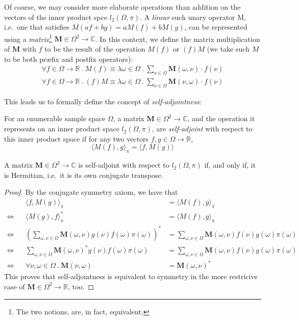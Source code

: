 	Of course, we may consider more elaborate operations than addition on the vectors of the
	inner product spce $l_2(\Omega, \pi)$. A \emph{linear} such unary operator M, i.e.\ one 
	that satisfies $M (a f + b g) = a M(f) + b M(g)$, can be represented using a 
	\emph{matrix}\footnote{The two notions, are, in fact, equivalent.}
	$\mathbf{M} \in \Omega^2 \rightarrow \mathbb{C}$. In this context, we define the matrix 
	multiplication of $\mathbf{M}$ with $f$ to be the result of the operation $M(f)$ or $(f)M$ 
	(we take such $M$ to be both pr{\ae}fix and postfix operators):
	\begin{align*}
		\forall f \in\Omega\rightarrow\mathbb{R}\ .\  M(f)\equiv\lambda \omega\in\Omega\ .\ 
		\sum_{\nu\in\Omega} \mathbf{M}(\omega, \nu) \cdot f(\nu) \\
		\forall f \in\Omega\rightarrow\mathbb{R}\ .\ (f)M\equiv\lambda \omega\in\Omega\ .\ 
		\sum_{\nu\in\Omega} \mathbf{M}(\nu, \omega) \cdot f(\nu)
	\end{align*}

	This leads us to formally define the concept of \emph{self-adjointness}:
	\begin{definition}
		For an enumerable sample space $\Omega$, a matrix $\mathbf{M} \in \Omega^2 
		\rightarrow \mathbb{C}$, and the operation it represents on an inner product space 
		$l_2(\Omega, \pi)$, are \emph{self-adjoint} with respect to this inner product 
		space if for any two vectors $f, g\in \Omega\rightarrow\mathbb{R}$, 
		$$		
			\langle M(f), g \rangle_\pi = \langle f, M(g) \rangle
		$$
	\end{definition}
	\begin{lemma}
		A matrix $\mathbf{M}\in\Omega^2\rightarrow\mathbb{C}$ is self-adjoint with respect
		to $l_2(\Omega, \pi)$ if, and only if, it is Hermitian, i.e.\ it is its
		own conjugate transpose.
	\end{lemma}
	\begin{proof}
		By the conjugate symmetry axiom, we have that
		\begin{align*}
			&& \langle f, M(g) \rangle_\pi &= \langle M(f) , g \rangle_\pi  \\
			\iff&& 
			\langle M(g), f\rangle_\pi^* &= \langle M(f),g\rangle_\pi 
			\\
			\iff&& 
			\left(
			\sum_{\omega,\nu\in\Omega}\mathbf{M}(\omega,\nu)g(\nu)f(\omega)\pi(\omega)
			\right)^*
			&=\sum_{\omega,\nu\in\Omega}
			\mathbf{M}(\omega,\nu)f(\nu)g(\omega)\pi(\omega) \\
			\iff&&  
			\sum_{\omega,\nu\in\Omega}
			\mathbf{M}(\omega,\nu)^*g(\nu)f(\omega)\pi(\omega) &=
			\sum_{\omega,\nu\in\Omega}
			\mathbf{M}(\omega,\nu)f(\nu)g(\omega)\pi(\omega)
			\\
			\iff&& 
			\forall \nu,\omega \in \Omega\ .\ 
			\mathbf{M}(\nu,\omega) &= \mathbf{M}(\omega,\nu)^*
		\end{align*}
		This proves that self-adjointness is equivalent to symmetry in the more restricive
		case of $\mathbf{M}\in\Omega^2\rightarrow\mathbb{R}$, too.
	\end{proof}


